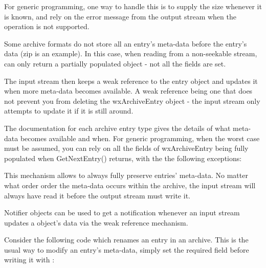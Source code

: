 For generic programming, one way to handle this is to supply the size
whenever it is known, and rely on the error message from the output
stream when the operation is not supported.


Some archive formats do not store all an entry's meta-data before the
entry's data (zip is an example). In this case, when reading from a
non-seekable stream,  
can only return a partially populated 
object - not all the fields are set.

The input stream then keeps a weak reference to the entry object and
updates it when more meta-data becomes available. A weak reference being
one that does not prevent you from deleting the wxArchiveEntry object - the
input stream only attempts to update it if it is still around.

The documentation for each archive entry type gives the details
of what meta-data becomes available and when. For generic programming,
when the worst case must be assumed, you can rely on all the fields
of wxArchiveEntry being fully populated when GetNextEntry() returns,
with the the following exceptions:

\begin{twocollist}\twocolwidtha{3cm}
\end{twocollist}

This mechanism allows 
to always fully preserve entries' meta-data. No matter what order order
the meta-data occurs within the archive, the input stream will always
have read it before the output stream must write it.


Notifier objects can be used to get a notification whenever an input
stream updates a  object's data
via the weak reference mechanism.

Consider the following code which renames an entry in an archive.
This is the usual way to modify an entry's meta-data, simply set the
required field before writing it with
 :

